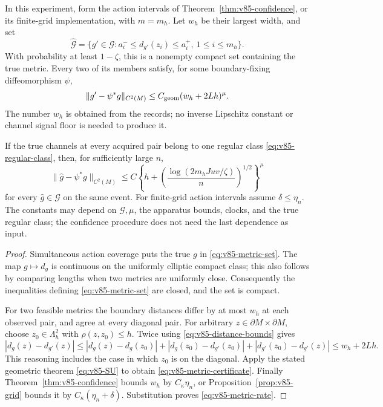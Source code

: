 \begin{theorem}
\label{thm:v85-geometric}
In this experiment, form the action intervals of
Theorem~\ref{thm:v85-confidence}, or its finite-grid implementation,
with $m=m_h$. Let $w_h$ be their largest width, and set
\begin{equation}\label{eq:v85-metric-set}
 \widehat{\mathcal G}=
   \{g'\in\mathcal G:a_i^-\le d_{g'}(z_i)\le a_i^+,
                                                \ 1\le i\le m_h\}.
\end{equation}
With probability at least $1-\zeta$, this is a nonempty compact set
containing the true metric. Every two of its members satisfy, for
some boundary-fixing diffeomorphism $\psi$,
\begin{equation}\label{eq:v85-metric-certificate}
           \|g'-\psi^*g\|_{C^2(M)}
                  \le C_{\rm geom}(w_h+2Lh)^\mu.
\end{equation}
The number $w_h$ is obtained from the records; no inverse Lipschitz
constant or channel signal floor is needed to produce it.

If the true channels at every acquired pair belong to one regular
class \eqref{eq:v85-regular-class}, then, for sufficiently large $n$,
\begin{equation}\label{eq:v85-metric-rate}
 \|\widehat g-\psi^*g\|_{C^2(M)}
 \le C\left\{h+
       \left(\frac{\log(2m_hJuv/\zeta)}{n}\right)^{1/2}\right\}^{\mu}
\end{equation}
for every $\widehat g\in\widehat{\mathcal G}$ on the same event.
For finite-grid action intervals assume $\delta\le\eta_n$.
The constants may depend on $\mathcal G,\mu$, the apparatus bounds,
clocks, and the true regular class; the confidence procedure does not
need the last dependence as input.
\end{theorem}
\begin{proof}
Simultaneous action coverage puts the true $g$ in
\eqref{eq:v85-metric-set}. The map $g\mapsto d_g$ is continuous on
the uniformly elliptic compact class; this also follows by comparing
lengths when two metrics are uniformly close. Consequently the
inequalities defining \eqref{eq:v85-metric-set} are closed, and the
set is compact.

For two feasible metrics the boundary distances differ by at most
$w_h$ at each observed pair, and agree at every diagonal pair.
For arbitrary $z\in\partial M\times\partial M$, choose
$z_0\in\Lambda_h^2$ with $\rho(z,z_0)\le h$. Twice using
\eqref{eq:v85-distance-bounds} gives
\[
 |d_g(z)-d_{g'}(z)|
 \le |d_g(z)-d_g(z_0)|+|d_g(z_0)-d_{g'}(z_0)|
                       +|d_{g'}(z_0)-d_{g'}(z)|
 \le w_h+2Lh.
\]
This reasoning includes the case in which $z_0$ is on the diagonal.
Apply the stated geometric theorem \eqref{eq:v85-SU} to obtain
\eqref{eq:v85-metric-certificate}. Finally
Theorem~\ref{thm:v85-confidence} bounds $w_h$ by $C_\kappa\eta_n$,
or Proposition~\ref{prop:v85-grid} bounds it by
$C_\kappa(\eta_n+\delta)$. Substitution proves
\eqref{eq:v85-metric-rate}.
\end{proof}
